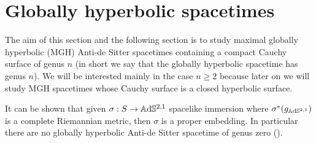 \section{Globally hyperbolic spacetimes}
The aim of this section and the following section is to study maximal globally hyperbolic (MGH) Anti-de Sitter spacetimes containing a compact Cauchy surface of genus $n$ (in short we say that the globally hyperbolic spacetime has genus $n$). We will be interested mainly in the case $n\geq 2$ because later on we will study MGH spacetimes whose Cauchy surface is a closed hyperbolic surface.\\ 
\begin{observation} \label{rem:genus 0}
    It can be shown that given $\sigma :S \to\mathbb{A}\mathrm{d}\mathbb{S}^{2,1}$ spacelike immersion where $\sigma^*(g_{\mathbb{A}\mathrm{d}\mathbb{S}^{2,1}})$ is a complete Riemannian metric, then $\sigma$ is a proper embedding.
    In particular there are no globally hyperbolic Anti-de Sitter spacetime of genus zero (\cite{bonsanteseppi}).
\end{observation}


